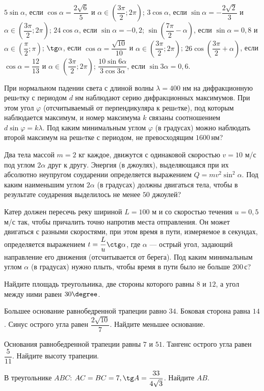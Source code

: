 \begin{class}[number=3]
\begin{listofex}
\begin{tasks}
			\task \( 5\sin\alpha \), если \( \cos\alpha=\dfrac{2\sqrt{6}}{5} \) и \( \alpha\in\left( \dfrac{3\pi}{2}; 2\pi \right) \);
			\task \( 3\cos\alpha \), если \( \sin\alpha=-\dfrac{2\sqrt{2}}{3} \) и \( \alpha\in\left( \dfrac{3\pi}{2}; 2\pi \right) \);
			\task \( 24\cos\alpha \), если \( \sin\alpha=-0,2 \);
			\task \( \sin\left( \dfrac{7\pi}{2}-\alpha \right) \), если \( \sin\alpha=0,8 \) и \( \alpha\in\left( \dfrac{\pi}{2}; \pi \right) \);
			\task \( \tg \alpha \), если \( \cos \alpha = \dfrac{ \sqrt{10} }{ 10 } \) и \( \alpha\in\left( \dfrac{ 3\pi }{ 2 };2\pi \right) \);
			\task \( 26 \cos \left( \dfrac{ 3\pi }{ 2 }+\alpha \right) \), если \( \cos \alpha = \dfrac{ 12 }{ 13 } \) и \( \alpha\in\left( \dfrac{ 3\pi }{ 2 };2\pi \right) \);
			\task \( \dfrac{ 10\sin 6 \alpha }{ 3 \cos 3 \alpha } \), если \( \sin 3 \alpha = 0,6 \).
		\end{tasks}
		\item При нормальном падении света с длиной волны \( \lambda=400 \) нм на дифракционную решeтку с периодом \(d\) нм наблюдают серию дифракционных максимумов. При этом угол \(\varphi\)  (отсчитываемый от перпендикуляра к решeтке), под которым наблюдается максимум, и номер максимума \(k\) связаны соотношением \(d \sin \varphi= k\lambda\). Под каким минимальным углом \(\varphi\) (в градусах) можно наблюдать второй максимум на решeтке с периодом, не превосходящим \(1600\) нм?
		\item Два тела массой \(m=2\) кг каждое, движутся с одинаковой скоростью  \(v =10\) м/с под углом \(2\alpha\) друг к другу. Энергия (в джоулях), выделяющаяся при их абсолютно неупругом соударении определяется выражением \(Q= m v^2 \sin^2 \alpha \). Под каким наименьшим углом \(2\alpha\) (в градусах) должны двигаться тела, чтобы в результате соударения выделилось не менее \(50\) джоулей?
		\item Катер должен пересечь реку шириной \(L = 100\) м и со скоростью течения \(u =0,5\) м/с так, чтобы причалить точно напротив места отправления. Он может двигаться с разными скоростями, при этом время в пути, измеряемое в секундах, определяется выражением \(t = \dfrac{ L }{ u } \ctg \alpha \),  где \(\alpha\) --- острый угол, задающий направление его движения (отсчитывается от берега). Под каким минимальным углом \(\alpha\) (в градусах) нужно плыть, чтобы время в пути было не больше \(200\) с?
		\item Найдите площадь треугольника, две стороны которого равны \(8\) и \(12\), а угол между ними равен \(30 \degree\).
		\item Большее основание равнобедренной трапеции равно \(34\). Боковая сторона равна \(14\). Синус острого угла равен \( \dfrac{ 2\sqrt{10}}{ 7 } \). Найдите меньшее основание.
		\item Основания равнобедренной трапеции равны \(7\) и \(51\). Тангенс острого угла равен \( \dfrac{ 5 }{ 11 } \).  Найдите высоту трапеции.
		\item В треугольнике \(ABC\): \(AC=BC=7, \tg A = \dfrac{ 33 }{ 4\sqrt{3} }\). Найдите \(AB\).
	\end{listofex}
\end{class}

